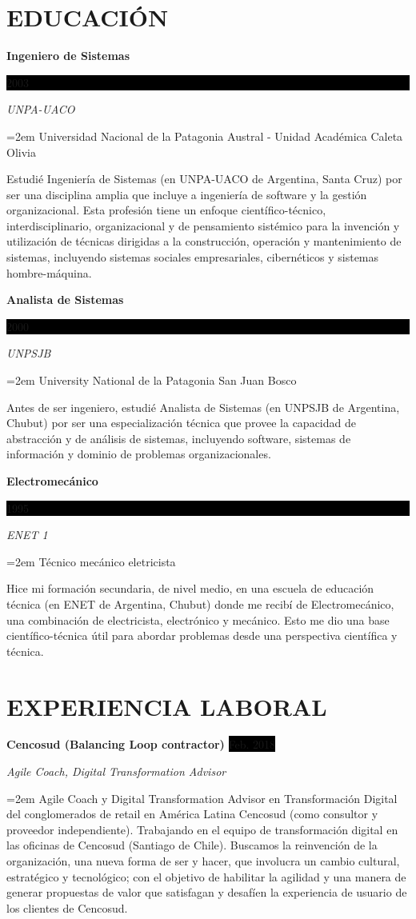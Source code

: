 \documentclass[paper=a4,fontsize=11pt]{scrartcl} %
\newcommand{\sepspace}{\vspace*{1em}}		%
\newcommand{\NewPart}[1]{\section*{\uppercase{#1}}}
\newcommand{\EducationEntry}[4]{
		\noindent \textbf{#1} \hfill      %
		\colorbox{Black}{%
			\parbox{6em}{%
			\hfill\color{White}#2}} \par  %
		\noindent \textit{#3} \par        %
		\noindent\hangindent=2em\hangafter=0 \small #4 %
		\normalsize \par}
\newcommand{\WorkEntry}[4]{				  %
		\noindent \textbf{#1} \hfill      %
		\colorbox{Black}{\color{White}#2} \par  %
		\noindent \textit{#3} \par              %
		\noindent\hangindent=2em\hangafter=0 \small #4 %
		\normalsize \par}
\begin{document}
\sepspace

\NewPart{Educación}{}

\EducationEntry{Ingeniero de Sistemas}{2003}{UNPA-UACO}
{Universidad Nacional de la Patagonia Austral - Unidad Académica Caleta Olivia}

Estudié Ingeniería de Sistemas (en UNPA-UACO de Argentina, Santa Cruz) por ser una disciplina amplia que incluye a ingeniería de software y la gestión organizacional. Esta profesión tiene un enfoque científico-técnico, interdisciplinario, organizacional y de pensamiento sistémico para la invención y utilización de técnicas dirigidas a la construcción, operación y mantenimiento de sistemas, incluyendo sistemas sociales empresariales, cibernéticos y sistemas hombre-máquina.
\sepspace

\EducationEntry{Analista de Sistemas}{2000}{UNPSJB}
{University National de la Patagonia San Juan Bosco}

Antes de ser ingeniero, estudié Analista de Sistemas (en UNPSJB de Argentina, Chubut) por ser una especialización técnica que provee la capacidad de abstracción y de análisis de sistemas, incluyendo software, sistemas de información y dominio de problemas organizacionales. 
\sepspace

\EducationEntry{Electromecánico}{1995}{ENET 1}
{Técnico mecánico eletricista}

Hice mi formación secundaria, de nivel medio, en una escuela de educación técnica (en ENET de Argentina, Chubut) donde me recibí de Electromecánico, una combinación de electricista, electrónico y mecánico. Esto me dio una base científico-técnica útil para abordar problemas desde una perspectiva científica y técnica.
\sepspace

\NewPart{Experiencia laboral}{}

\WorkEntry{Cencosud (Balancing Loop contractor)}{Feb. 2018}{Agile Coach, Digital Transformation Advisor}{
Agile Coach y Digital Transformation Advisor en Transformación Digital del conglomerados de retail en América Latina Cencosud (como consultor y proveedor independiente). Trabajando en el equipo de transformación digital en las oficinas de Cencosud (Santiago de Chile). Buscamos la reinvención de la organización, una nueva forma de ser y hacer, que involucra un cambio cultural, estratégico y tecnológico; con el objetivo de habilitar la agilidad y una manera de generar propuestas de valor que satisfagan y desafíen la experiencia de usuario de los clientes de Cencosud.
}
\end{document}
